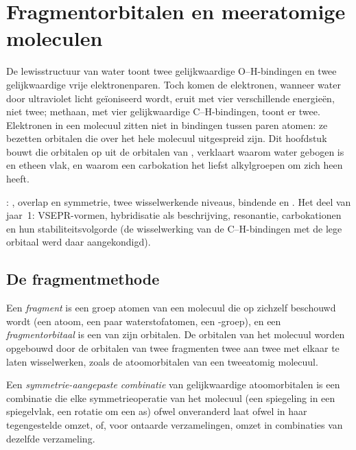 \chapter{Fragmentorbitalen en meeratomige moleculen}\label{ch:b2:fragment-orbitals}

De lewisstructuur van water toont twee gelijkwaardige O--H-bindingen en twee
gelijkwaardige vrije elektronenparen. Toch komen de elektronen, wanneer water door ultraviolet licht
geïoniseerd wordt, eruit met vier verschillende energieën, niet twee; methaan, met vier
gelijkwaardige C--H-bindingen, toont er twee. Elektronen in een molecuul zitten niet in bindingen
tussen paren atomen: ze bezetten orbitalen die over het hele molecuul uitgespreid zijn.
Dit hoofdstuk bouwt die orbitalen op uit de orbitalen van , verklaart
waarom water gebogen is en etheen vlak, en waarom een carbokation het liefst
alkylgroepen om zich heen heeft.

\begin{recall}
: , overlap en symmetrie, twee wisselwerkende niveaus,
bindende en . Het deel van jaar~1: VSEPR-vormen, hybridisatie
als beschrijving, resonantie, carbokationen en hun stabiliteitsvolgorde (de
wisselwerking van de C--H-bindingen met de lege orbitaal werd daar aangekondigd).
\end{recall}

\section{De fragmentmethode}

\begin{definition}[Fragmenten]\label{def:b2:fragment-orbitals:fragment}
Een \emph{fragment} is een groep atomen van een molecuul die op
zichzelf beschouwd wordt (een atoom, een paar waterstofatomen, een -groep), en een
\emph{fragmentorbitaal} is een van zijn orbitalen. De orbitalen van het
molecuul worden opgebouwd door de orbitalen van twee fragmenten twee aan twee met elkaar te laten
wisselwerken, zoals de atoomorbitalen van een tweeatomig molecuul.
\end{definition}

\begin{definition}\label{def:b2:fragment-orbitals:symmetry-adapted}
Een \emph{symmetrie-aangepaste combinatie} van
gelijkwaardige atoomorbitalen is een combinatie die elke symmetrieoperatie van het
molecuul (een spiegeling in een spiegelvlak, een rotatie om een as) ofwel
onveranderd laat ofwel in haar tegengestelde omzet, of, voor ontaarde verzamelingen, omzet
in combinaties van dezelfde verzameling.
\end{definition}

